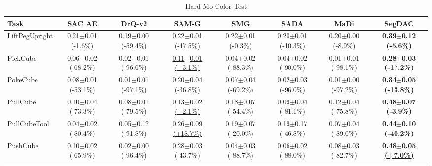 \begin{table}[htbp]
\centering
\scriptsize
\caption{Hard Mo Color Test}
\label{tab:appendix_mocolortest_hard}
\begin{adjustbox}{max width=\textwidth}
\begin{tabular}{l*{7}{c}}
\toprule
\textbf{Task} & \textbf{SAC AE} & \textbf{DrQ-v2} & \textbf{SAM-G} & \textbf{SMG} & \textbf{SADA} & \textbf{MaDi} & \textbf{SegDAC} \\
\midrule
LiftPegUpright & 0.21$\pm$0.01 \scriptsize{(-1.6\%)} & 0.19$\pm$0.00 \scriptsize{(-59.4\%)} & 0.22$\pm$0.01 \scriptsize{(-47.5\%)} & \underline{0.22$\pm$0.01 \scriptsize{(-0.3\%)}} & 0.20$\pm$0.01 \scriptsize{(-10.3\%)} & 0.20$\pm$0.00 \scriptsize{(-8.9\%)} & \textbf{0.39$\pm$0.12 \scriptsize{(-5.6\%)}} \\
PickCube & 0.06$\pm$0.02 \scriptsize{(-68.2\%)} & 0.02$\pm$0.01 \scriptsize{(-96.6\%)} & \underline{0.11$\pm$0.01 \scriptsize{(+3.1\%)}} & 0.04$\pm$0.02 \scriptsize{(-88.3\%)} & 0.04$\pm$0.02 \scriptsize{(-90.0\%)} & 0.01$\pm$0.01 \scriptsize{(-98.1\%)} & \textbf{0.28$\pm$0.03 \scriptsize{(-17.2\%)}} \\
PokeCube & 0.08$\pm$0.01 \scriptsize{(-53.1\%)} & 0.01$\pm$0.01 \scriptsize{(-97.1\%)} & 0.20$\pm$0.04 \scriptsize{(-36.8\%)} & 0.07$\pm$0.04 \scriptsize{(-69.2\%)} & 0.02$\pm$0.03 \scriptsize{(-96.0\%)} & 0.01$\pm$0.00 \scriptsize{(-97.2\%)} & \textbf{\underline{0.34$\pm$0.05 \scriptsize{(-13.8\%)}}} \\
PullCube & 0.10$\pm$0.04 \scriptsize{(-73.3\%)} & 0.08$\pm$0.01 \scriptsize{(-79.5\%)} & \underline{0.13$\pm$0.02 \scriptsize{(+2.1\%)}} & 0.18$\pm$0.07 \scriptsize{(-54.4\%)} & 0.09$\pm$0.04 \scriptsize{(-81.1\%)} & 0.12$\pm$0.04 \scriptsize{(-75.8\%)} & \textbf{0.48$\pm$0.07 \scriptsize{(-3.9\%)}} \\
PullCubeTool & 0.04$\pm$0.02 \scriptsize{(-80.4\%)} & 0.05$\pm$0.12 \scriptsize{(-91.8\%)} & \underline{0.26$\pm$0.09 \scriptsize{(+18.7\%)}} & 0.19$\pm$0.07 \scriptsize{(-20.0\%)} & 0.19$\pm$0.17 \scriptsize{(-46.8\%)} & 0.07$\pm$0.04 \scriptsize{(-89.0\%)} & \textbf{0.44$\pm$0.10 \scriptsize{(-40.2\%)}} \\
PushCube & 0.10$\pm$0.02 \scriptsize{(-65.9\%)} & 0.02$\pm$0.00 \scriptsize{(-96.4\%)} & 0.28$\pm$0.03 \scriptsize{(-43.7\%)} & 0.04$\pm$0.03 \scriptsize{(-88.7\%)} & 0.06$\pm$0.02 \scriptsize{(-88.0\%)} & 0.08$\pm$0.03 \scriptsize{(-82.7\%)} & \textbf{\underline{0.48$\pm$0.05 \scriptsize{(+7.0\%)}}} \\

\end{tabular}
\end{adjustbox}
\end{table}
